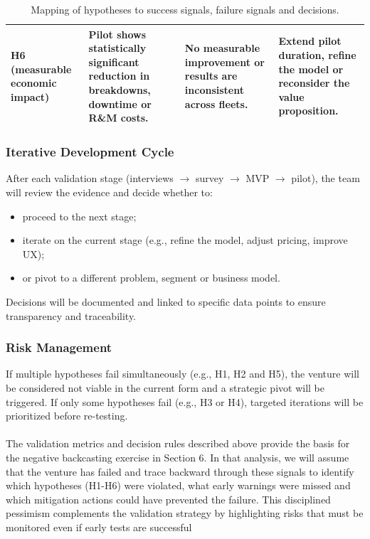 \documentclass[11pt,a4paper]{article}
\begin{document}
\begin{table}[H]
\begin{tabularx}{\linewidth}{X X X X}
H6 (measurable economic impact) &
Pilot shows statistically significant reduction in breakdowns, downtime or R\&M costs. &
No measurable improvement or results are inconsistent across fleets. &
Extend pilot duration, refine the model or reconsider the value proposition. \\

\bottomrule
\end{tabularx}
\caption{Mapping of hypotheses to success signals, failure signals and decisions.}
\label{tab:hypothesis-signals}
\end{table}

\subsubsection{Iterative Development Cycle}
\noindent After each validation stage (interviews $\rightarrow$ survey $\rightarrow$ MVP $\rightarrow$ pilot), the team will review the evidence and decide whether to: 
\begin{itemize}
    \item proceed to the next stage; 
    \item iterate on the current stage (e.g., refine the model, adjust pricing, improve UX); 
    \item or pivot to a different problem, segment or business model. 
\end{itemize} 
Decisions will be documented and linked to specific data points to ensure transparency and traceability.

\subsubsection{Risk Management}
\noindent If multiple hypotheses fail simultaneously (e.g., H1, H2 and H5), the venture will be considered not viable in the current form and a strategic pivot will be triggered. If only some hypotheses fail (e.g., H3 or H4), targeted iterations will be prioritized before re-testing.
\\
\\ The validation metrics and decision rules described above provide the basis for the negative backcasting exercise in Section 6. In that analysis, we will assume that the venture has failed and trace backward through these signals to identify which hypotheses (H1-H6) were violated, what early warnings were missed and which mitigation actions could have prevented the failure. This disciplined pessimism complements the validation strategy by highlighting risks that must be monitored even if early tests are successful
\end{document}
